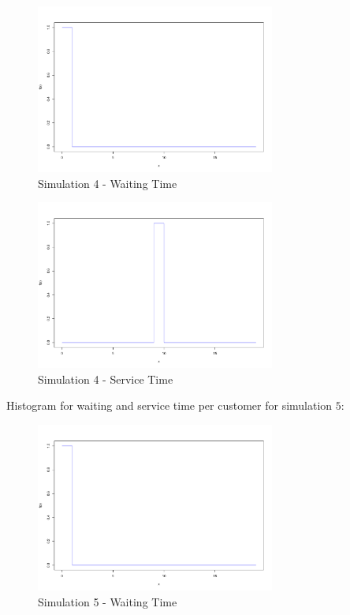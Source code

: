 \begin{figure}[H]
	\centering
  \includegraphics[width=0.7\textwidth]{serie_02/data/Simulation4/waiting_time.pdf}
	\caption{Simulation 4 - Waiting Time}
	\label{fig3}
\end{figure}

\begin{figure}[H]
	\centering
  \includegraphics[width=0.7\textwidth]{serie_02/data/Simulation4/service_time.pdf}
	\caption{Simulation 4 - Service Time}
	\label{fig3}
\end{figure}
\newpage
Histogram for waiting and service time per customer for simulation $5$:\\

\begin{figure}[H]
	\centering
  \includegraphics[width=0.7\textwidth]{serie_02/data/Simulation5/waiting_time.pdf}
	\caption{Simulation 5 - Waiting Time}
	\label{fig3}
\end{figure}

